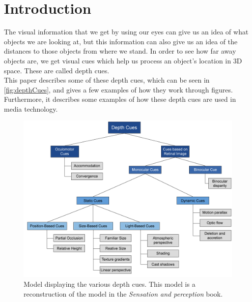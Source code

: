 \section{Introduction}

The visual information that we get by using our eyes can give us an idea of what objects we are looking at, but this information can also give us an idea of the distances to those objects from where we stand. In order to see how far away objects are, we get visual cues which help us process an object's location in 3D space. These are called depth cues\citep[p.~195]{sensationPerception}.\\
This paper describes some of these depth cues, which can be seen in \autoref{fig:depthCues}, and gives a few examples of how they work through figures. Furthermore, it describes some examples of how these depth cues are used in media technology.

\begin{figure}[H]
	\centering
	\includegraphics[width=1\linewidth]{figure/Analysis/depthCues.png}
	\caption{Model displaying the various depth cues. This model is a reconstruction of the model in the \textit{Sensation and perception} book\citep[p.~195]{sensationPerception}.}
	\label{fig:depthCues}
\end{figure}